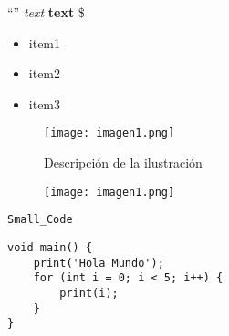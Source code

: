 
“”                %
\textit {text}    %
\textbf{text}     %
\$                %
\begin{itemize}   %
    \item item1
    
    \item item2
    
    \item item3
\end{itemize}

\begin{figure}[H]
    \centering
    \texttt{[image: imagen1.png]}
    \caption{Descripción de la ilustración}
    \label{fig:reference}
\end{figure}


\begin{figure}[H]
    \centering
    \texttt{[image: imagen1.png]}
\end{figure}


\parencite{Name_Of_The_Author}


\lstinline{Small_Code}


\begin{center}
\begin{lstlisting}
void main() {
    print('Hola Mundo');
    for (int i = 0; i < 5; i++) {
        print(i);
    }
}
\end{lstlisting}
\end{center}
